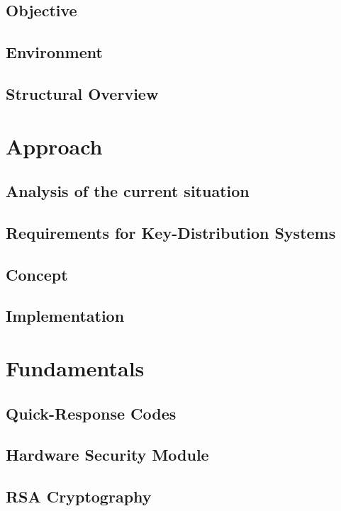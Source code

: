 \documentclass[12pt,oneside,a4paper,parskip]{scrbook}
\begin{document}
\section{Objective}

\section{Environment}

\section{Structural Overview}

\chapter{Approach}

\section{Analysis of the current situation}

\section{Requirements for Key-Distribution Systems}

\section{Concept}

\section{Implementation}

\chapter{Fundamentals}

\section{Quick-Response Codes}

\section{Hardware Security Module}

\section{RSA Cryptography}
\end{document}
